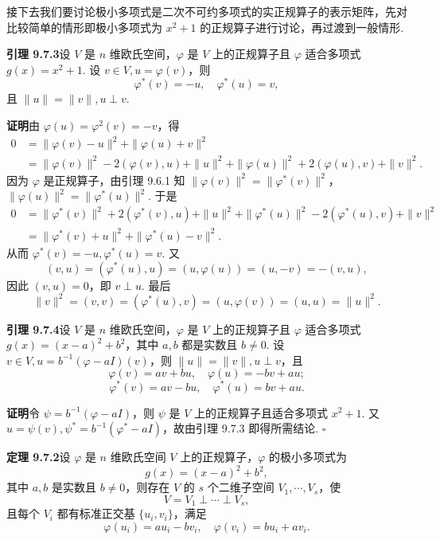 \documentclass[UTF8,12pt,a4paper,fontset=fandol]{ctexart}
\begin{document}
接下去我们要讨论极小多项式是二次不可约多项式的实正规算子的表示矩阵，先对比较简单的情形即极小多项式为 $x^2+1$ 的正规算子进行讨论，再过渡到一般情形.

\noindent\textbf{引理 9.7.3}\quad 设 $V$ 是 $n$ 维欧氏空间，$\varphi$ 是 $V$ 上的正规算子且 $\varphi$ 适合多项式 $g(x)=x^2+1$. 设 $v\in V,u=\varphi(v)$，则
\[
  \varphi^*(v)=-u,\quad \varphi^*(u)=v,
\]
且 $\|u\|=\|v\|,u\perp v$.

\noindent\textbf{证明}\quad 由 $\varphi(u)=\varphi^2(v)=-v$，得
\[
\begin{aligned}
  0
  &= \|\varphi(v)-u\|^2+\|\varphi(u)+v\|^2\\
  &= \|\varphi(v)\|^2-2(\varphi(v),u)+\|u\|^2
     +\|\varphi(u)\|^2+2(\varphi(u),v)+\|v\|^2.
\end{aligned}
\]
因为 $\varphi$ 是正规算子，由引理 9.6.1 知 $\|\varphi(v)\|^2=\|\varphi^*(v)\|^2$，$\|\varphi(u)\|^2=\|\varphi^*(u)\|^2$. 于是
\[
\begin{aligned}
  0
  &= \|\varphi^*(v)\|^2+2(\varphi^*(v),u)+\|u\|^2
     +\|\varphi^*(u)\|^2-2(\varphi^*(u),v)+\|v\|^2\\
  &= \|\varphi^*(v)+u\|^2+\|\varphi^*(u)-v\|^2.
\end{aligned}
\]
从而 $\varphi^*(v)=-u,\varphi^*(u)=v$. 又
\[
  (v,u)=(\varphi^*(u),u)=(u,\varphi(u))=(u,-v)=-(v,u),
\]
因此 $(v,u)=0$，即 $v\perp u$. 最后
\[
  \|v\|^2=(v,v)=(\varphi^*(u),v)=(u,\varphi(v))=(u,u)=\|u\|^2.
\]

\noindent\textbf{引理 9.7.4}\quad 设 $V$ 是 $n$ 维欧氏空间，$\varphi$ 是 $V$ 上的正规算子且 $\varphi$ 适合多项式 $g(x)=(x-a)^2+b^2$，其中 $a,b$ 都是实数且 $b\ne0$. 设 $v\in V,u=b^{-1}(\varphi-aI)(v)$，则 $\|u\|=\|v\|,u\perp v$，且
\[
  \varphi(v)=av+bu,\quad \varphi(u)=-bv+au;
\]
\[
  \varphi^*(v)=av-bu,\quad \varphi^*(u)=bv+au.
\]

\noindent\textbf{证明}\quad 令 $\psi=b^{-1}(\varphi-aI)$，则 $\psi$ 是 $V$ 上的正规算子且适合多项式 $x^2+1$. 又 $u=\psi(v),\psi^*=b^{-1}(\varphi^*-aI)$，故由引理 9.7.3 即得所需结论. $\square$

\noindent\textbf{定理 9.7.2}\quad 设 $\varphi$ 是 $n$ 维欧氏空间 $V$ 上的正规算子，$\varphi$ 的极小多项式为
\[
  g(x)=(x-a)^2+b^2,
\]
其中 $a,b$ 是实数且 $b\ne0$，则存在 $V$ 的 $s$ 个二维子空间 $V_1,\cdots,V_s$，使
\[
  V=V_1\perp\cdots\perp V_s,
\]
且每个 $V_i$ 都有标准正交基 $\{u_i,v_i\}$，满足
\begin{equation}
  \varphi(u_i)=au_i-bv_i,\quad \varphi(v_i)=bu_i+av_i.
  \tag{9.7.2}
\end{equation}
\end{document}
